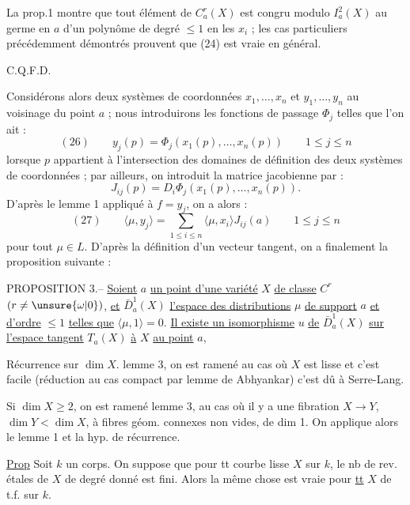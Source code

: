 La prop.1 montre que tout élément de $C_a^r(X)$ est congru modulo $I_a^2(X)$ au germe en $a$ d'un polynôme de degré $\leq1$ en les $x_i$ ; les cas particuliers précédemment démontrés prouvent que (24) est vraie en général.
\begin{flushright}C.Q.F.D.\end{flushright}

Considérons alors deux systèmes de coordonnées $x_1,\ldots,x_n$ et $y_1,\ldots,y_n$ au voisinage du point $a$ ; nous introduirons les fonctions de passage $\Phi_j$ telles que l'on ait :
\[
(26)\qquad y_j(p)=\Phi_j(x_1(p),\ldots,x_n(p))
\qquad 1\leq j\leq n
\]
lorsque $p$ appartient à l'intersection des domaines de définition des deux systèmes de coordonnées ; par ailleurs, on introduit la matrice jacobienne par :
\[
J_{ij}(p)=D_i\Phi_j(x_1(p),\ldots,x_n(p)).
\]
D'après le lemme 1 appliqué à $f=y_j$, on a alors :
\[
(27)\qquad
\langle\mu,y_j\rangle=\sum_{1\leq i\leq n}\langle\mu,x_i\rangle J_{ij}(a)
\qquad 1\leq j\leq n
\]
pour tout $\mu\in L$. D'après la définition d'un vecteur tangent, on a finalement la proposition suivante :

PROPOSITION 3.-- \uline{Soient} $a$ \uline{un point d'une variété} $X$ \uline{de classe} $C^r$ $(r\neq\unsure{\omega|0})$, \uline{et} $\bar D_a^1(X)$ \uline{l'espace des distributions} $\mu$ \uline{de support} $a$ \uline{et d'ordre} $\leq1$ \uline{telles que} $\langle\mu,1\rangle=0$.
\uline{Il existe un isomorphisme} $u$ \uline{de} $\bar D_a^1(X)$ \uline{sur l'espace tangent} $T_a(X)$ \uline{à} $X$ \uline{au point} $a$,

Récurrence sur $\dim X$.
lemme 3, on est ramené au cas où $X$ est lisse et
c'est facile (réduction au cas compact par lemme de Abhyankar)
c'est dû à Serre-Lang.

Si $\dim X\geq2$, on est ramené 
lemme 3, au cas où il y a une fibration  $X\to Y$, $\dim Y<\dim X$, 
 à fibres géom. connexes non vides, de dim 1.
On applique alors le lemme 1 et la hyp. de récurrence.

\uline{Prop} Soit $k$ un corps. On suppose que pour tt 
courbe  lisse $X$ sur $k$, le nb de rev. étales de $X$ de degré donné est fini.
Alors la même chose est vraie pour \uline{tt} $X$ de t.f. sur $k$.

